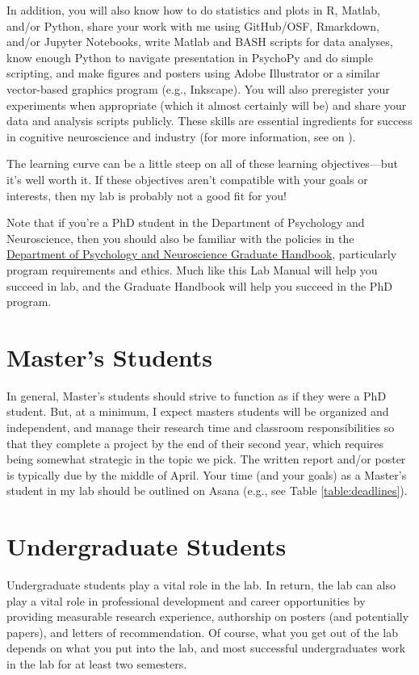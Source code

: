 \documentclass[letterpaper,11pt,oneside]{memoir}
\begin{document}
In addition, you will also know how to do statistics and plots in R, Matlab, and/or Python, share your work with me using GitHub/OSF, Rmarkdown, and/or Jupyter Notebooks, write Matlab and BASH scripts for data analyses, know enough Python to navigate presentation in PsychoPy and do simple scripting, and make figures and posters using Adobe Illustrator or a similar vector-based graphics program (e.g., Inkscape). You will also preregister your experiments when appropriate (which it almost certainly will be) and share your data and analysis scripts publicly. These skills are essential ingredients for success in cognitive neuroscience and industry (for more information, see  on ).

The learning curve can be a little steep on all of these learning objectives---but it's well worth it. If these objectives aren't compatible with your goals or interests, then my lab is probably not a good fit for you!

Note that if you're a PhD student in the Department of Psychology and Neuroscience, then you should also be familiar with the policies in the \href{https://docs.google.com/document/d/1hoxVN1ol7ZGB10_9N0k8yVxkRDJLcMVYGTp-Nwgbm94/edit}{Department of Psychology and Neuroscience Graduate Handbook}, particularly program requirements and ethics. Much like this Lab Manual will help you succeed in lab, and the Graduate Handbook will help you succeed in the PhD program.


\section{Master's Students}

In general, Master's students should strive to function as if they were a PhD student. But, at a minimum, I expect masters students will be organized and independent, and manage their research time and classroom responsibilities so that they complete a project by the end of their second year, which requires being somewhat strategic in the topic we pick. The written report and/or poster is typically due by the middle of April. Your time (and your goals) as a Master's student in my lab should be outlined on Asana (e.g., see Table \ref{table:deadlines}).

\section{Undergraduate Students}

Undergraduate students play a vital role in the lab. In return, the lab can also play a vital role in professional development and career opportunities by providing measurable research experience, authorship on posters (and potentially papers), and letters of recommendation. Of course, what you get out of the lab depends on what you put into the lab, and most successful undergraduates work in the lab for at least two semesters. 
\end{document}
